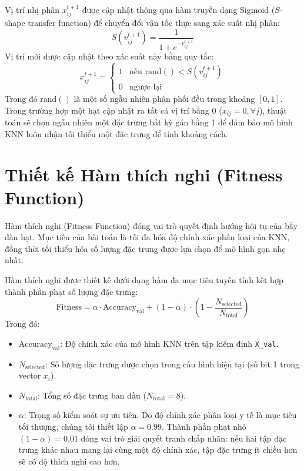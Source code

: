 \documentclass[a4paper,12pt]{report}
\begin{document}
\begin{itemize}
Vị trí nhị phân $x_{ij}^{t+1}$ được cập nhật thông qua hàm truyền dạng Sigmoid ($S$-shape transfer function) để chuyển đổi vận tốc thực sang xác suất nhị phân:
\begin{equation}
    S(v_{ij}^{t+1}) = \frac{1}{1 + e^{-v_{ij}^{t+1}}}
\end{equation}
Vị trí mới được cập nhật theo xác suất này bằng quy tắc:
\begin{equation}
    x_{ij}^{t+1} = \begin{cases}
        1 & \text{nếu } \text{rand}() < S(v_{ij}^{t+1}) \\
        0 & \text{ngược lại}
    \end{cases}
\end{equation}
Trong đó $\text{rand}()$ là một số ngẫu nhiên phân phối đều trong khoảng $[0, 1]$. Trong trường hợp một hạt cập nhật ra tất cả vị trí bằng 0 ($x_{ij} = 0, \forall j$), thuật toán sẽ chọn ngẫu nhiên một đặc trưng bất kỳ gán bằng 1 để đảm bảo mô hình KNN luôn nhận tối thiểu một đặc trưng để tính khoảng cách.

\section{Thiết kế Hàm thích nghi (Fitness Function)}
Hàm thích nghi (Fitness Function) đóng vai trò quyết định hướng hội tụ của bầy đàn hạt. Mục tiêu của bài toán là tối đa hóa độ chính xác phân loại của KNN, đồng thời tối thiểu hóa số lượng đặc trưng được lựa chọn để mô hình gọn nhẹ nhất.

Hàm thích nghi được thiết kế dưới dạng hàm đa mục tiêu tuyến tính kết hợp thành phần phạt số lượng đặc trưng:
\begin{equation}
    \text{Fitness} = \alpha \cdot \text{Accuracy}_{\text{val}} + (1 - \alpha) \cdot \left(1 - \frac{N_{\text{selected}}}{N_{\text{total}}}\right)
\end{equation}
Trong đó:
\begin{itemize}
    \item $\text{Accuracy}_{\text{val}}$: Độ chính xác của mô hình KNN trên tập kiểm định \texttt{X\_val}.
    \item $N_{\text{selected}}$: Số lượng đặc trưng được chọn trong cấu hình hiện tại (số bit 1 trong vector $x_i$).
    \item $N_{\text{total}}$: Tổng số đặc trưng ban đầu ($N_{\text{total}} = 8$).
    \item $\alpha$: Trọng số kiểm soát sự ưu tiên. Do độ chính xác phân loại y tế là mục tiêu tối thượng, chúng tôi thiết lập $\alpha = 0.99$. Thành phần phạt nhỏ $(1-\alpha) = 0.01$ đóng vai trò giải quyết tranh chấp nhãn: nếu hai tập đặc trưng khác nhau mang lại cùng một độ chính xác, tập đặc trưng ít chiều hơn sẽ có độ thích nghi cao hơn.
\end{itemize}


\end{itemize}
\end{document}
